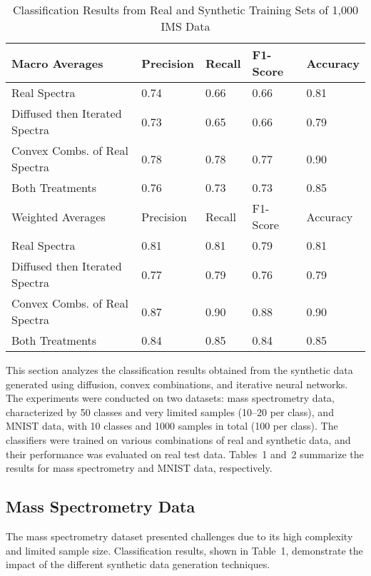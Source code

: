 \documentclass[sigconf]{acmart}
\begin{document}
\begin{table*}
  \caption{Classification Results from Real and Synthetic Training Sets of 1,000 IMS Data}
  \label{tab:commands}
  \begin{tabular}{l|l|l|l|l}
    \toprule
    Macro Averages & Precision & Recall & F1-Score & Accuracy\\
    \midrule
    Real Spectra & 0.74 & 0.66 & 0.66 & 0.81 \\
    Diffused then Iterated Spectra & 0.73 & 0.65 & 0.66 & 0.79 \\
    Convex Combs. of Real Spectra & 0.78 & 0.78 & 0.77 & 0.90 \\
    Both Treatments & 0.76 & 0.73 & 0.73 & 0.85 \\
    \midrule
    Weighted Averages & Precision & Recall & F1-Score & Accuracy\\
    \midrule
    Real Spectra & 0.81 & 0.81 & 0.79 & 0.81 \\
    Diffused then Iterated Spectra & 0.77 & 0.79 & 0.76 & 0.79 \\
    Convex Combs. of Real Spectra & 0.87 & 0.90 & 0.88 & 0.90 \\
    Both Treatments & 0.84 & 0.85 & 0.84 & 0.85 \\
    \bottomrule
  \end{tabular}
\end{table*}



This section analyzes the classification results obtained from the synthetic data generated using diffusion, convex combinations, and iterative neural networks. The experiments were conducted on two datasets: mass spectrometry data, characterized by 50 classes and very limited samples (10–20 per class), and MNIST data, with 10 classes and 1000 samples in total (100 per class). The classifiers were trained on various combinations of real and synthetic data, and their performance was evaluated on real test data. Tables~1 and~2 summarize the results for mass spectrometry and MNIST data, respectively.

\subsection{Mass Spectrometry Data}

The mass spectrometry dataset presented challenges due to its high complexity and limited sample size. Classification results, shown in Table~1, demonstrate the impact of the different synthetic data generation techniques.
\end{document}
